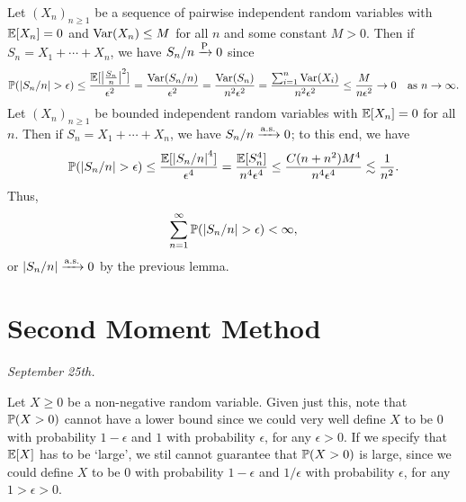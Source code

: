 Let $(X_{n})_{n \geq 1}$ be a sequence of pairwise independent random variables with $\mathbb{E}[X_{n}] = 0$ and $\operatorname{Var}(X_{n}) \leq M$ for all $n$ and some constant $M > 0$. Then if $S_{n} = X_{1} + \cdots + X_{n}$, we have $S_{n}/n \xrightarrow{\operatorname{P}} 0$ since
\begin{align}
    \mathbb{P}(\left| S_{n}/n \right| > \epsilon) \leq \frac{\mathbb{E}[\left| \frac{S_{n}}{n} \right|^{2}]}{\epsilon^{2}} = \frac{\operatorname{Var}(S_{n}/n)}{\epsilon^{2}} = \frac{\operatorname{Var}(S_{n})}{n^{2}\epsilon^{2}} = \frac{\sum_{i=1}^{n} \operatorname{Var}(X_{i})}{n^{2}\epsilon^{2}} \leq \frac{M}{n\epsilon^{2}} \to 0 \quad \text{as } n \to \infty.
\end{align}
Let $(X_{n})_{n \geq 1}$ be bounded independent random variables with $\mathbb{E}[X_{n}] = 0$ for all $n$. Then if $S_{n} = X_{1} + \cdots + X_{n}$, we have $S_{n}/n \xrightarrow{\operatorname{a.s.}} 0$; to this end, we have
\begin{align}
    \mathbb{P}(\left| S_{n}/n \right| > \epsilon) \leq \frac{\mathbb{E}[\left| S_{n}/n \right|^{4}]}{\epsilon^{4}} = \frac{\mathbb{E}[S_{n}^{4}]}{n^{4}\epsilon^{4}} \leq \frac{C(n+n^{2})M^{4}}{n^{4}\epsilon^{4}} \lesssim \frac{1}{n^{2}}.
\end{align}
Thus,
\begin{align}
    \sum_{n=1}^{\infty} \mathbb{P}(\left| S_{n}/n \right| > \epsilon) < \infty,
\end{align}
or $\left| S_{n}/n \right| \xrightarrow{\operatorname{a.s.}} 0$ by the previous lemma.

\section{Second Moment Method}
\textit{September 25th.}

Let $X \geq 0$ be a non-negative random variable. Given just this, note that $\mathbb{P}(X > 0)$ cannot have a lower bound since we could very well define $X$ to be $0$ with probability $1-\epsilon$ and $1$ with probability $\epsilon$, for any $\epsilon > 0$. If we specify that $\mathbb{E}[X]$ has to be `large', we stil cannot guarantee that $\mathbb{P}(X > 0)$ is large, since we could define $X$ to be $0$ with probability $1-\epsilon$ and $1/\epsilon$ with probability $\epsilon$, for any $1 > \epsilon > 0$.

